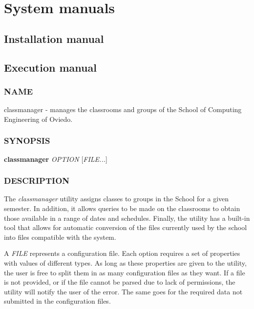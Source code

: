 \renewcommand{\documentname}{System manuals}

\chapter{System manuals}


\section{Installation manual}



\section{Execution manual}


\subsection*{NAME}

\begin{description}
    \item classmanager - manages the classrooms and groups of the School of Computing Engineering of Oviedo.
\end{description}


\subsection*{SYNOPSIS}

\begin{description}
    \item \textbf{classmanager} \textit{OPTION} [\textit{FILE...}]
\end{description}


\subsection*{DESCRIPTION}

The \textit{classmanager} utility assigns classes to groups in the School for a given semester. In addition, it allows queries to be made on the classrooms to obtain those available in a range of dates and schedules. Finally, the utility has a built-in tool that allows for automatic conversion of the files currently used by the school into files compatible with the system. 

A \textit{FILE} represents a configuration file. Each option requires a set of properties with values of different types. As long as these properties are given to the utility, the user is free to split them in as many configuration files as they want. If a file is not provided, or if the file cannot be parsed due to lack of permissions, the utility will notify the user of the error. The same goes for the required data not submitted in the configuration files. 


